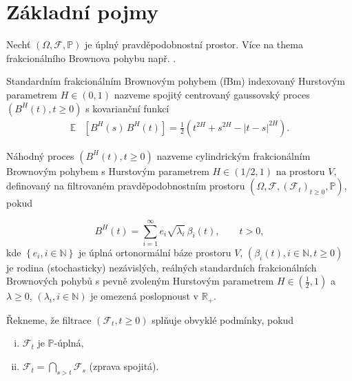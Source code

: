 
\chapter{Základní pojmy}

Nechť $\left( \Omega, \mathscr{F}, \mathbb{P} \right)$ je úplný
pravděpodobnostní prostor. Více na thema frakcionálního Brownova pohybu např.
\cite{nourdin2013selected}.


\begin{definice}\label{def:fbm}
    Standardním frakcionálním Brownovým pohybem (\vspace{2pt}fBm) indexovaný
    Hurstovým parametrem $H\in\left(0,1\right)$ nazveme spojitý centrovaný
    gaussovský proces $\left( B^H (t),t\geq 0\right)$ s kovarianční funkcí
    \begin{align*}
      \mathbb{E}& \left[ B^H (s) \, B^H (t) \right] =
      \frac{1}{2}\left( t^{2H}+s^{2H}-|t-s|^{2H} \right).
    \end{align*}
\end{definice}


\begin{definice}
    Náhodný proces $\left(B^H(t),t\geq0\right)$ nazveme cylindrickým frakcionálním Brownovým
    pohybem s Hurstovým parametrem $H\in\left(1/2,1\right)$ na prostoru $V$, definovaný na
    filtrovaném pravděpodobnostním prostoru $\left( \Omega, \mathscr{F}, \left(
    \mathscr{F}_t\right)_{t\geq0},\mathbb{P} \right)$, pokud
    
    $$ B^H(t) = \sum_{i=1}^\infty e_i \sqrt{\lambda_i}\, \beta_i (t), \qquad
    t>0,$$
    kde $\left\{ e_i, i\in\mathbb{N} \right\}$ je úplná ortonormální báze
    prostoru $V$, $\left( \beta_i(t),i\in\mathbb{N},t\geq0 \right)$ je rodina
    (stochasticky) nezávislých, reálných standardních frakcionálních
    Brownových pohybů s pevně zvoleným Hurstovým parametrem $H\in\left(
    {\frac{1}{2},1}\right)$ a $\lambda\geq0$, $\left(
    \lambda_i,i\in\mathbb{N} \right)$ je omezená poslopnoust v
    $\mathbb{R}_+$.
\end{definice}


\begin{definice}
    Řekneme, že filtrace $\left( \mathscr{F}_t,t\geq0 \right)$ splňuje obvyklé podmínky, pokud
    \begin{enumerate}[(i)]
        \item $\mathscr{F}_t$ je $\mathbb{P}$-úplná,
        \item $\mathscr{F}_t = \bigcap_{s>t} \mathscr{F}_s$  (zprava spojitá).
    \end{enumerate}
\end{definice}


